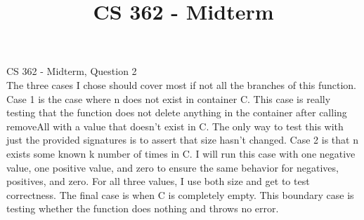 \documentclass[11pt,letterpaper]{article}
\begin{document}
 \univlogo

\title{CS 362 - Midterm}
{\Huge CS 362 - Midterm, Question 2}\\[5mm]
The three cases I chose should cover most if not all the branches
of this function. 
Case 1 is the case where n does not exist
in container C. This case is really testing that the function does not delete anything
in the container after calling removeAll with a value that doesn't exist in
C. The only way to test this with just the provided signatures is to assert that
size hasn't changed. Case 2 is that n exists some known k number of times in C. 
I will run this case with one 
negative value, one positive value, and zero to ensure the same behavior for
negatives, positives, and zero. For all three values, I use both size and get to test
correctness. The final case is when C is completely empty. This boundary case is
testing whether the function does nothing and throws no error. 
\end{document}
